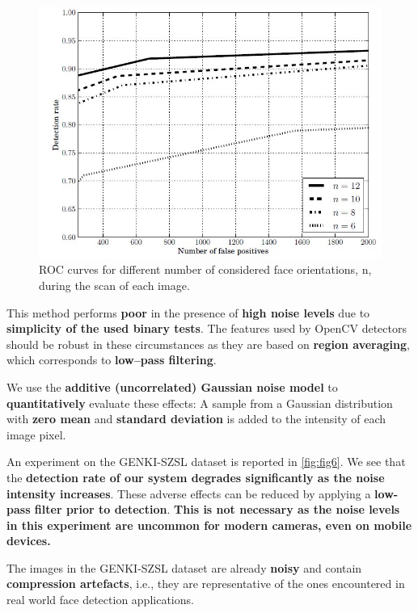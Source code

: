 \documentclass[a4paper,12pt]{article}
\begin{document}
\begin{figure}[h!]
  \centering
  \includegraphics[width=\textwidth, keepaspectratio=true]{ObjectDetectionPixelIntensityFig7.jpg}
  \caption{ROC curves for different number of considered face orientations, n, during the scan of each image.}
 \label{fig:fig7}
\end{figure}

This method performs \textbf{poor} in the presence of \textbf{high noise levels} due to
\textbf{simplicity of the used binary tests}. The features used by OpenCV detectors should be robust in these circumstances as they are based on \textbf{region averaging}, which corresponds to \textbf{low--pass filtering}.

We use the \textbf{additive (uncorrelated) Gaussian noise model} to \textbf{quantitatively} evaluate these effects:
A sample from a Gaussian distribution with \textbf{zero mean} and \textbf{standard deviation} is added to the intensity of each image pixel.

An experiment on the GENKI-SZSL dataset is reported in \autoref{fig:fig6}. We see that the \textbf{detection rate of our system degrades significantly as the noise intensity increases}. These adverse effects can be reduced by applying a \textbf{low-pass filter prior to detection}.
\textbf{This is not necessary as the noise levels in this experiment are uncommon for modern cameras,
even on mobile devices.}

The images in the GENKI-SZSL dataset are already \textbf{noisy} and contain
\textbf{compression artefacts}, i.e., they are representative of the ones encountered in real world
face detection applications.
\end{document}
